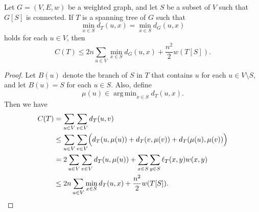 \documentclass[11pt]{article}
\DeclareMathOperator*{\argmin}{arg \, min}
\begin{document}
\begin{theorem}
  Let $G = (V, E, w)$ be a weighted graph, and let $S$ be a subset of $V$ such that $G[S]$ is connected.
  If $T$ is a spanning tree of $G$ such that
  \begin{equation*}
    \min_{x \in S} d_T(u, x) = \min_{x \in S} d_G(u, x)
  \end{equation*}
  holds for each $u \in V$, then
  \begin{equation*}
    C(T) \leq 2n \sum_{u \in V} \min_{x \in S} d_G(u, x) + \frac{n^2}{2} w(T[S]).
  \end{equation*}
\end{theorem}
\begin{proof}
  Let $B(u)$ denote the branch of $S$ in $T$ that contains $u$ for each $u \in V \setminus S$, and let $B(u) = S$ for each $u \in S$.
  Also, define
  \begin{equation*}
    \mu(u) \in \argmin_{x \in S} d_T(u, x).
  \end{equation*}
  Then we have
  \begin{align*}
    C(T)
    &= \sum_{u \in V} \sum_{v \in V} d_T(u, v) \\
    &\leq \sum_{u \in V} \sum_{v \in V} \Bigl(d_T(u, \mu(u)) + d_T(v, \mu(v)) + d_T(\mu(u), \mu(v))\Bigr) \\
    &= 2 \sum_{u \in V}\sum_{v \in V} d_T(u, \mu(u)) + \sum_{x \in S} \sum_{y \in S} \ell_T(x, y) w(x, y) \\
    &\leq 2n \sum_{u \in V} \min_{x \in S} d_T(u, x) + \frac{n^2}{2} w(T[S]).
    \qedhere
  \end{align*}
\end{proof}
\end{document}
